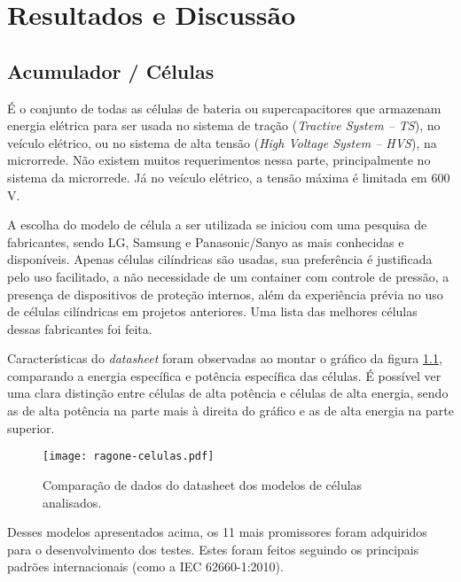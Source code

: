 \chapter{Resultados e Discussão}
\label{cap:exemplos}

\graphicspath{{\currfiledir/figuras/}}


\section{Acumulador / Células}

    É o conjunto de todas as células de bateria ou supercapacitores que armazenam energia elétrica para ser usada no sistema de tração (\textit{Tractive System – TS}), no veículo elétrico, ou no sistema de alta tensão (\textit{High Voltage System – HVS}), na microrrede. Não existem muitos requerimentos nessa parte, principalmente no sistema da microrrede. Já no veículo elétrico, a tensão máxima é limitada em 600 V.

    A escolha do modelo de célula a ser utilizada se iniciou com uma pesquisa de fabricantes, sendo LG, Samsung e Panasonic/Sanyo as mais conhecidas e disponíveis. Apenas células cilíndricas são usadas, sua preferência é justificada pelo uso facilitado, a não necessidade de um container com controle de pressão, a presença de dispositivos de proteção internos, além da experiência prévia no uso de células cilíndricas em projetos anteriores. Uma lista das melhores células dessas fabricantes foi feita.

    Características do \textit{datasheet} foram observadas ao montar o gráfico da figura \ref{fig:ragone-celulas}, comparando a energia específica e potência específica das células. É possível ver uma clara distinção entre células de alta potência e células de alta energia, sendo as de alta potência na parte mais à direita do gráfico e as de alta energia na parte superior.

    \begin{figure}[!htb]
        \centering
        \texttt{[image: ragone-celulas.pdf]}
        \caption{Comparação de dados do datasheet dos modelos de células analisados.}
        \label{fig:ragone-celulas}
    \end{figure}

    Desses modelos apresentados acima, os 11 mais promissores foram adquiridos para o desenvolvimento dos testes. Estes foram feitos seguindo os principais padrões internacionais (como a IEC 62660-1:2010). 

